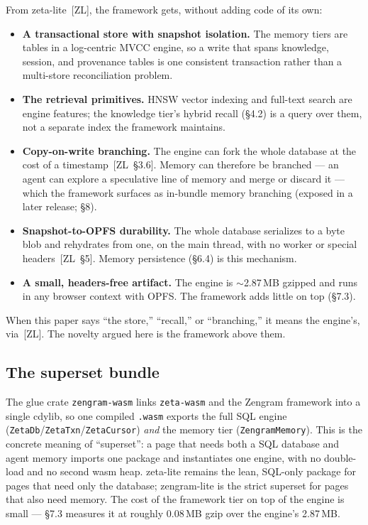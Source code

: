 \documentclass[11pt]{article}
\newcommand{\code}[1]{\texttt{#1}}
\begin{document}
From zeta-lite~[ZL], the framework gets, without adding code of its own:
\begin{itemize}[leftmargin=1.4em,itemsep=0.2em]
  \item \textbf{A transactional store with snapshot isolation.} The memory tiers
    are tables in a log-centric MVCC engine, so a write that spans knowledge,
    session, and provenance tables is one consistent transaction rather than a
    multi-store reconciliation problem.
  \item \textbf{The retrieval primitives.} HNSW vector indexing and full-text
    search are engine features; the knowledge tier's hybrid recall (\S4.2) is a
    query over them, not a separate index the framework maintains.
  \item \textbf{Copy-on-write branching.} The engine can fork the whole database
    at the cost of a timestamp~[ZL~\S3.6]. Memory can therefore be branched ---
    an agent can explore a speculative line of memory and merge or discard it ---
    which the framework surfaces as in-bundle memory branching (exposed in a later
    release; \S8).
  \item \textbf{Snapshot-to-OPFS durability.} The whole database serializes to a
    byte blob and rehydrates from one, on the main thread, with no worker or
    special headers~[ZL~\S5]. Memory persistence (\S6.4) is this mechanism.
  \item \textbf{A small, headers-free artifact.} The engine is $\sim$2.87\,MB
    gzipped and runs in any browser context with OPFS. The framework adds little
    on top (\S7.3).
\end{itemize}

When this paper says ``the store,'' ``recall,'' or ``branching,'' it means the
engine's, via~[ZL]. The novelty argued here is the framework above them.

\subsection{The superset bundle}

The glue crate \code{zengram-wasm} links \code{zeta-wasm} and the Zengram
framework into a single cdylib, so one compiled \code{.wasm} exports the full SQL
engine (\code{ZetaDb}/\code{ZetaTxn}/\code{ZetaCursor}) \emph{and} the memory tier
(\code{ZengramMemory}). This is the concrete meaning of ``superset'': a page that
needs both a SQL database and agent memory imports one package and instantiates
one engine, with no double-load and no second wasm heap. zeta-lite remains the
lean, SQL-only package for pages that need only the database; zengram-lite is the
strict superset for pages that also need memory. The cost of the framework tier on
top of the engine is small --- \S7.3 measures it at roughly 0.08\,MB gzip over the
engine's 2.87\,MB.
\end{document}
